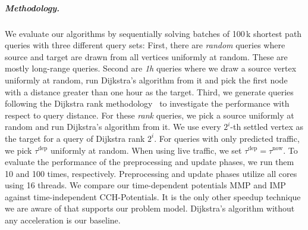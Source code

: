 \documentclass[a4paper,UKenglish,cleveref, autoref, thm-restate,anonymous]{lipics-v2021}
\newcommand*{\tdep}{\tau^{\operatorname{dep}}}
\newcommand*{\tnow}{\tau^{\operatorname{now}}}
\begin{document}

\subparagraph{Methodology.}
We evaluate our algorithms by sequentially solving batches of 100\,k shortest path queries with three different query sets:
First, there are \emph{random} queries where source and target are drawn from all vertices uniformly at random.
These are mostly long-range queries.
Second are \emph{1h} queries where we draw a source vertex uniformly at random, run Dijkstra's algorithm from it and pick the first node with a distance greater than one hour as the target.
Third, we generate queries following the Dijkstra rank methodology~\cite{ss-hhhes-05} to investigate the performance with respect to query distance.
For these \emph{rank} queries, we pick a source uniformly at random and run Dijkstra's algorithm from it.
We use every $2^{i}$-th settled vertex as the target for a query of Dijkstra rank $2^i$.
For queries with only predicted traffic, we pick $\tdep$ uniformly at random.
When using live traffic, we set $\tdep = \tnow$.
To evaluate the performance of the preprocessing and update phases, we run them 10 and 100 times, respectively.
Preprocessing and update phases utilize all cores using 16 threads.
%
We compare our time-dependent potentials MMP and IMP against time-independent CCH-Potentials.
It is the only other speedup technique we are aware of that supports our problem model.
Dijkstra's algorithm without any acceleration is our baseline.
\end{document}
